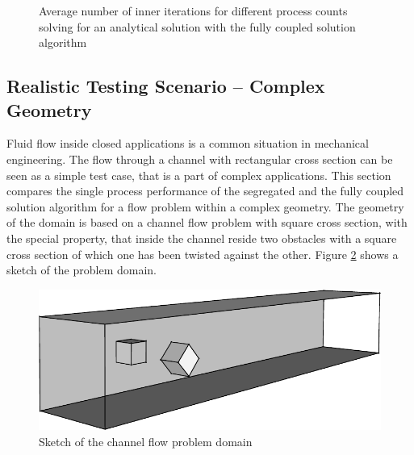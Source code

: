 \begin{figure}[h!]
  \begin{center}
  \end{center}
  \caption{Average number of inner iterations for different process counts solving for an analytical solution with the fully coupled solution algorithm}
  \label{fig:weakinner}
\end{figure}

\subsection{Realistic Testing Scenario -- Complex Geometry}
\label{sec:channel}

Fluid flow inside closed applications is a common situation in mechanical engineering. The flow through a channel with rectangular cross section can be seen as a simple test case, that is a part of complex applications. This section compares the single process performance of the segregated and the fully coupled solution algorithm for a flow problem within a complex geometry. The geometry of the domain is based on a channel flow problem with square cross section, with the special property, that inside the channel reside two obstacles with a square cross section of which one has been twisted against the other. Figure \ref{fig:sketch} shows a sketch of the problem domain. 

\begin{figure}
  \centering
  \includegraphics{./img/channel3d.pdf}
  \caption{Sketch of the channel flow problem domain}
  \label{fig:sketch}
\end{figure}

